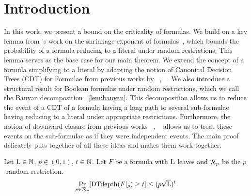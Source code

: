 \section{Introduction}
\label{sec:introduction}
        
In this work, we present a bound on the criticality of \demorgan formulas. We build on a key lemma from \hastad's work on the shrinkage exponent of \demorgan formulas~\cite{hastad1998shrinkage}, which bounds the probability of a formula reducing to a literal under random restrictions. This lemma serves as the base case for our main theorem. We extend the concept of a formula simplifying to a literal by adapting the notion of Canonical Decision Trees (CDT) for Formulae from previous works by ~\cite{rossmanCriticalityRegularFormulas2019}, ~\cite{harshaCriticalityAC0Formulae2023}. 
We also introduce a structural result for Boolean formulas under random restrictions, which we call the Banyan decomposition ~\cref{lem:banyan}. This decomposition allows us to reduce the event of a CDT of a formula having a long path to several sub-formulae having reducing to a literal under appropriate restrictions. Furthermore, the notion of downward closure from previous works ~\cite{hastad2014parity}, ~\cite{harshaCriticalityAC0Formulae2023} allows us to treat these events on the sub-formulae as if they  were independent events. 
The main proof delicately puts together of all these ideas and  makes them work together.

\begin{theorem}
\label{thm: main}
    Let $\mathrm{L} \in \mathbb{N}$, $p \in (0,1)$, $t \in \mathbb{N}$. Let $F$ be a \demorgan formula with $\mathrm{L}$ leaves and $\mathbf{\mathcal{R}}_p$ be the $p$-random restriction.
    $$\Pr_{\rho \in \mathbf{\mathcal{R}}_p}[\operatorname{DTdepth}(F|_\rho) \geq t] \leq (p\sqrt{\mathrm{L}})^t$$
\end{theorem}

